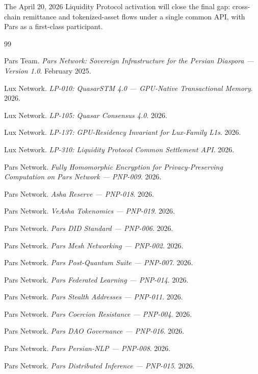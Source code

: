 \documentclass[11pt,a4paper]{article}
\begin{document}
The April 20, 2026 Liquidity Protocol activation will close the final
gap: cross-chain remittance and tokenized-asset flows under a single
common API, with Pars as a first-class participant.


\begin{thebibliography}{99}

 Pars Team. \emph{Pars Network: Sovereign Infrastructure for the Persian Diaspora --- Version 1.0}. February 2025.

 Lux Network. \emph{LP-010: QuasarSTM 4.0 --- GPU-Native Transactional Memory}. 2026.

 Lux Network. \emph{LP-105: Quasar Consensus 4.0}. 2026.

 Lux Network. \emph{LP-137: GPU-Residency Invariant for Lux-Family L1s}. 2026.

 Lux Network. \emph{LP-310: Liquidity Protocol Common Settlement API}. 2026.

 Pars Network. \emph{Fully Homomorphic Encryption for Privacy-Preserving Computation on Pars Network --- PNP-009}. 2026.

 Pars Network. \emph{Asha Reserve --- PNP-018}. 2026.

 Pars Network. \emph{VeAsha Tokenomics --- PNP-019}. 2026.

 Pars Network. \emph{Pars DID Standard --- PNP-006}. 2026.

 Pars Network. \emph{Pars Mesh Networking --- PNP-002}. 2026.

 Pars Network. \emph{Pars Post-Quantum Suite --- PNP-007}. 2026.

 Pars Network. \emph{Pars Federated Learning --- PNP-014}. 2026.

 Pars Network. \emph{Pars Stealth Addresses --- PNP-011}. 2026.

 Pars Network. \emph{Pars Coercion Resistance --- PNP-004}. 2026.

 Pars Network. \emph{Pars DAO Governance --- PNP-016}. 2026.

 Pars Network. \emph{Pars Persian-NLP --- PNP-008}. 2026.

 Pars Network. \emph{Pars Distributed Inference --- PNP-015}. 2026.

\end{thebibliography}
\end{document}
